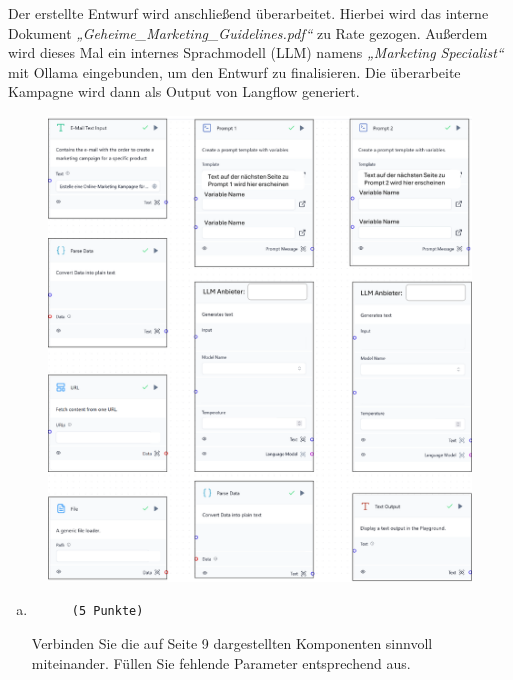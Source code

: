 \documentclass[12pt, ngerman]{AssignmentClass}
\begin{document}
    Der erstellte Entwurf wird anschließend überarbeitet. Hierbei wird das interne Dokument \textit{„Geheime\_Marketing\_Guidelines.pdf“} zu Rate gezogen. Außerdem wird dieses Mal ein internes Sprachmodell (LLM) namens \textit{„Marketing Specialist“} mit Ollama eingebunden, um den Entwurf zu finalisieren. Die überarbeite Kampagne wird dann als Output von Langflow generiert.\\
    
    \begin{figure}[ht]
        \centering
        \includegraphics[width=\linewidth]{media/Aufgabe 6/Aufgabe6.pdf}
        \label{fig:Aufgabe6}
    \end{figure}

    \begin{enumerate}[a)]
		\item 
			\begin{minipage}[t]{\linewidth}
				\vspace{-0.61em}
				\begin{figure} 
					\raggedleft
					\texttt{(5 Punkte)}
				\end{figure}
                Verbinden Sie die auf Seite 9 dargestellten Komponenten sinnvoll miteinander. Füllen Sie fehlende Parameter entsprechend aus.
			\end{minipage}
	\end{enumerate}
\end{document}
